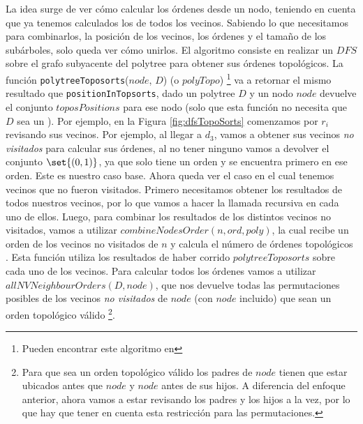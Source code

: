 La idea surge de ver cómo calcular los órdenes desde un nodo, teniendo en cuenta que ya tenemos calculados los de todos los vecinos. Sabiendo lo que necesitamos para combinarlos, la posición de los vecinos, los órdenes y el tamaño de los subárboles, solo queda ver cómo unirlos. El algoritmo consiste en realizar un $DFS$ sobre el grafo subyacente del polytree para obtener sus órdenes topológicos. La función \texttt{polytreeToposorts}($node$, $D$) (o $polyTopo$) \footnote{Pueden encontrar este algoritmo en } va a retornar el mismo resultado que \texttt{positionInTopsorts}, dado un polytree $D$ y un nodo $node$ devuelve el conjunto $toposPositions$ para ese nodo (solo que esta función no necesita que $D$ sea un \dtree). Por ejemplo, en la Figura \ref{fig:dfsTopoSorts} comenzamos por $r_i$ revisando sus vecinos. Por ejemplo, al llegar a $d_3$, vamos a obtener sus vecinos \emph{no visitados} para calcular sus órdenes, al no tener ninguno vamos a devolver el conjunto $\set{(0,1)}$, ya que solo tiene un orden y se encuentra primero en ese orden. Este es nuestro caso base. Ahora queda ver el caso en el cual tenemos vecinos que no fueron visitados. 
Primero necesitamos obtener los resultados de todos nuestros vecinos, por lo que vamos a hacer la llamada recursiva en cada uno de ellos. Luego, para combinar los resultados de los distintos vecinos no visitados, vamos a utilizar $combineNodesOrder(n, ord, poly)$, la cual recibe un orden de los vecinos no visitados de $n$ y calcula el número de órdenes topológicos . Esta función utiliza los resultados de haber corrido $polytreeToposorts$ sobre cada uno de los vecinos. Para calcular todos los órdenes vamos a utilizar $allNVNeighbourOrders(D,node)$, que nos devuelve todas las permutaciones posibles de los vecinos \emph{no visitados} de $node$ (con $node$ incluido) que sean un orden topológico válido \footnote{Para que sea un orden topológico válido los padres de $node$ tienen que estar ubicados antes que $node$ y $node$ antes de sus hijos. A diferencia del enfoque anterior, ahora vamos a estar revisando los padres y los hijos a la vez, por lo que hay que tener en cuenta esta restricción para las permutaciones.}.

